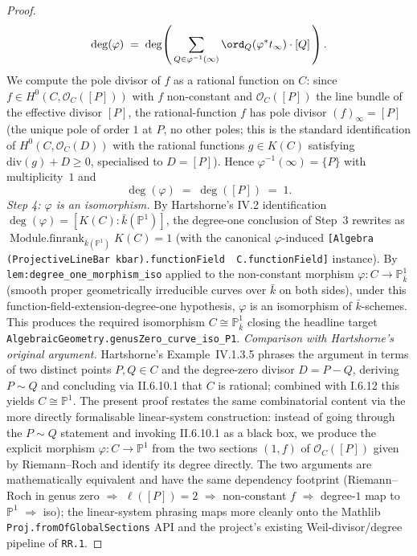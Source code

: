 \begin{proof}
  \[
    \deg(\varphi)
    \;=\;
    \deg\!\left(\,\sum_{Q \in \varphi^{-1}(\infty)}
                  \ord_Q(\varphi^* t_\infty) \cdot [Q]\,\right).
  \]
  We compute the pole divisor of \(f\) as a rational function on \(C\):
  since \(f \in H^0(C, \mathcal O_C([P]))\) with \(f\) non-constant and
  \(\mathcal O_C([P])\) the line bundle of the effective divisor \([P]\), the
  rational-function \(f\) has pole divisor \((f)_\infty = [P]\) (the
  unique pole of order \(1\) at \(P\), no other poles; this is the standard
  identification of \(H^0(C, \mathcal O_C(D))\) with the rational functions
  \(g \in K(C)\) satisfying \(\mathrm{div}(g) + D \geq 0\), specialised to
  \(D = [P]\)). Hence \(\varphi^{-1}(\infty) = \{P\}\) with multiplicity~\(1\)
  and
  \[
    \deg(\varphi) \;=\; \deg([P]) \;=\; 1.
  \]
  \emph{Step 4: \(\varphi\) is an isomorphism.} By Hartshorne's IV.2
  identification \(\deg(\varphi) = [K(C) : \bar k(\mathbb P^1)]\), the
  degree-one conclusion of Step~3 rewrites as
  \(\operatorname{Module.finrank}_{\bar k(\mathbb P^1)} K(C) = 1\) (with
  the canonical \(\varphi\)-induced
  \texttt{[Algebra \,(ProjectiveLineBar kbar).functionField\,
   C.functionField]} instance). By
  \texttt{lem:degree_one_morphism_iso} applied to the non-constant
  morphism \(\varphi \colon C \to \mathbb P^1_{\bar k}\) (smooth proper
  geometrically irreducible curves over \(\bar k\) on both sides), under
  this function-field-extension-degree-one hypothesis, \(\varphi\) is an
  isomorphism of \(\bar k\)-schemes.
  This produces the required isomorphism \(C \cong \mathbb P^1_{\bar k}\)
  closing the headline target
  \texttt{AlgebraicGeometry.genusZero\_curve\_iso\_P1}.
  \emph{Comparison with Hartshorne's original argument.} Hartshorne's
  Example~IV.1.3.5 phrases the argument in terms of two distinct points
  \(P, Q \in C\) and the degree-zero divisor \(D = P - Q\), deriving \(P \sim Q\)
  and concluding via II.6.10.1 that \(C\) is rational; combined with I.6.12
  this yields \(C \cong \mathbb P^1\). The present proof restates the same
  combinatorial content via the more directly formalisable linear-system
  construction: instead of going through the \(P \sim Q\) statement and
  invoking II.6.10.1 as a black box, we produce the explicit morphism
  \(\varphi \colon C \to \mathbb P^1\) from the two sections \((1, f)\) of
  \(\mathcal O_C([P])\) given by Riemann--Roch and identify its degree
  directly. The two arguments are mathematically equivalent and have the
  same dependency footprint (Riemann--Roch in genus zero \(\Rightarrow\)
  \(\ell([P]) = 2\) \(\Rightarrow\) non-constant \(f\) \(\Rightarrow\) degree-\(1\)
  map to \(\mathbb P^1\) \(\Rightarrow\) iso); the linear-system phrasing maps
  more cleanly onto the Mathlib \texttt{Proj.fromOfGlobalSections} API and
  the project's existing Weil-divisor/degree pipeline of \texttt{RR.1}.
\end{proof}
